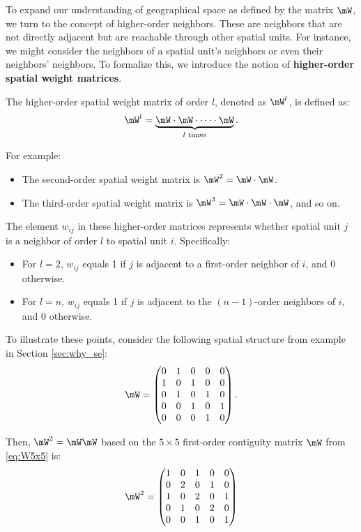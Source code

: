 \documentclass[english,12pt]{book}\usepackage[]{graphicx}\usepackage[]{xcolor}
\begin{document}
To expand our understanding of geographical space as defined by the matrix $\mW$, we turn to the concept of higher-order neighbors. These are neighbors that are not directly adjacent but are reachable through other spatial units. For instance, we might consider the neighbors of a spatial unit's neighbors or even their neighbors' neighbors. To formalize this, we introduce the notion of \textbf{higher-order spatial weight matrices}.

The higher-order spatial weight matrix of order $l$, denoted as $\mW^l$, is defined as:
\begin{equation*}
  \mW^l = \underbrace{\mW \cdot \mW \cdot \dots \cdot \mW}_{l \text{ times}}.
\end{equation*}

For example:
\begin{itemize}
\item The second-order spatial weight matrix is $\mW^2 = \mW \cdot \mW$.
\item The third-order spatial weight matrix is $\mW^3 = \mW \cdot \mW \cdot \mW$, and so on.
\end{itemize}

The element $w_{ij}$ in these higher-order matrices represents whether spatial unit $j$ is a neighbor of order $l$ to spatial unit $i$. Specifically:
\begin{itemize}
\item For $l = 2$, $w_{ij}$ equals 1 if $j$ is adjacent to a first-order neighbor of $i$, and 0 otherwise.
\item For $l = n$, $w_{ij}$ equals 1 if $j$ is adjacent to the $(n-1)$-order neighbors of $i$, and 0 otherwise.
\end{itemize}

To illustrate these points, consider the following spatial structure from example in Section \ref{sec:why_se}:
\begin{equation}\label{eq:W5x5}
\mW = \begin{pmatrix}
      0 & 1 & 0 & 0 & 0 \\
      1 & 0 & 1 & 0 & 0 \\
      0 & 1 & 0 & 1 & 0 \\
      0 & 0 & 1 & 0 & 1 \\
      0 & 0 & 0 & 1 & 0
      \end{pmatrix}.
\end{equation}

Then, $\mW^2 = \mW\mW$ based on the $5\times 5$ first-order contiguity matrix $\mW$ from \eqref{eq:W5x5} is:
\begin{equation}
\mW^2 = \begin{pmatrix}\label{eq:W25x5}
      1 & 0 & 1 & 0 & 0 \\
      0 & 2 & 0 & 1 & 0 \\
      1 & 0 & 2 & 0 & 1 \\
      0 & 1 & 0 & 2 & 0 \\
      0 & 0 & 1 & 0 & 1
      \end{pmatrix}
\end{equation}
\end{document}
